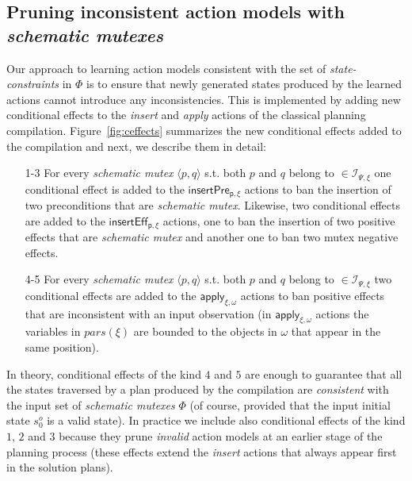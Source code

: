 \documentclass{article}
\newcommand{\tup}[1]{{\langle #1 \rangle}}
\newcommand{\strips}{\textsc{Strips}}
\begin{document}
\subsection{Pruning inconsistent action models with {\em schematic mutexes}}


Our approach to learning action models consistent with the set of {\em state-constraints} in $\Phi$ is to ensure that newly generated states produced by the learned actions cannot introduce any inconsistencies. This is implemented by adding new conditional effects to the {\em insert} and {\em apply} actions of the classical planning compilation. Figure~\ref{fig:ceffects} summarizes the new conditional effects added to the compilation and next, we describe them in detail:

\begin{enumerate}
\item[1-3] For every {\em schematic mutex} $\tup{p,q}$ s.t. both $p$ and $q$ belong to $\in{\mathcal I}_{\Psi,\xi}$ one conditional effect is added to the $\mathsf{insertPre_{p,\xi}}$ actions to ban the insertion of two preconditions that are {\em schematic mutex}. Likewise, two conditional effects are added to the $\mathsf{insertEff_{p,\xi}}$ actions, one to ban the insertion of two positive effects that are {\em schematic mutex} and another one to ban two mutex negative effects.
\item[4-5] For every {\em schematic mutex} $\tup{p,q}$ s.t. both $p$ and $q$ belong to $\in{\mathcal I}_{\Psi,\xi}$ two conditional effects are added to the $\mathsf{apply_{\xi,\omega}}$ actions to ban positive effects that are inconsistent with an input observation (in $\mathsf{apply_{\xi,\omega}}$ actions the variables in $pars(\xi)$ are bounded to the objects in $\omega$ that appear in the same position).
\end{enumerate}
In theory, conditional effects of the kind $4$ and $5$ are enough to guarantee that all the states traversed by a plan produced by the compilation are {\em consistent} with the input set of {\em schematic mutexes} $\Phi$ (of course, provided that the input initial state $s_0^o$ is a valid state). In practice we include also conditional effects of the kind $1$, $2$ and $3$ because they prune {\em invalid} action models at an earlier stage of the planning process (these effects extend the {\em insert} actions that always appear first in the solution plans).
\end{document}
